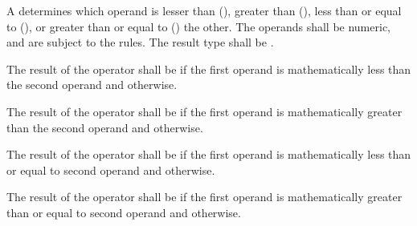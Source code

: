 \begin{grammar}
 \\
	 \\
	 \terminal{<}  \\
	 \terminal{>}  \\
	 \terminal{<=}  \\
	 \terminal{>=}  \\

 \\
	 \\
	 \terminal{==}  \\
	 \terminal{!=}  \\
\end{grammar}

\specsubsubitem
A  determines which operand is lesser than
(\terminal{<}), greater than (\terminal{>}), less than or equal to
(\terminal{<=}), or greater than or equal to (\terminal{>=}) the other. The
operands shall be numeric, and are subject to the 
rules.  The result type shall be .

\specsubsubitem
The result of the \terminal{<} operator shall be  if the first
operand is mathematically less than the second operand and 
otherwise.

\specsubsubitem
The result of the \terminal{>} operator shall be  if the first
operand is mathematically greater than the second operand and 
otherwise.

\specsubsubitem
The result of the \terminal{<=} operator shall be  if the
first operand is mathematically less than or equal to second operand
and  otherwise.

\specsubsubitem
The result of the \terminal{>=} operator shall be  if the first
operand is mathematically greater than or equal to second operand
and  otherwise.

